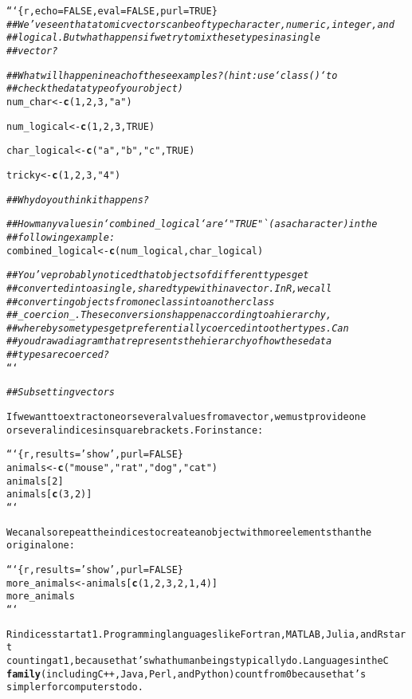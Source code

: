 \documentclass{article}\usepackage[]{graphicx}\usepackage[]{xcolor}
\makeatletter
\newcommand{\hlstr}[1]{\textcolor[rgb]{0.192,0.494,0.8}{#1}}%
\newcommand{\hlcom}[1]{\textcolor[rgb]{0.678,0.584,0.686}{\textit{#1}}}%
\newcommand{\hlkwd}[1]{\textcolor[rgb]{0.737,0.353,0.396}{\textbf{#1}}}%
\newenvironment{kframe}{%
 \def\at@end@of@kframe{}%
 \ifinner\ifhmode%
  \def\at@end@of@kframe{\end{minipage}}%
  \begin{minipage}{\columnwidth}%
 \fi\fi%
 \def\FrameCommand##1{\hskip\@totalleftmargin \hskip-\fboxsep
 \colorbox{shadecolor}{##1}\hskip-\fboxsep
     \hskip-\linewidth \hskip-\@totalleftmargin \hskip\columnwidth}%
 \MakeFramed {\advance\hsize-\width
   \@totalleftmargin\z@ \linewidth\hsize
   \@setminipage}}%
 {\par\unskip\endMakeFramed%
 \at@end@of@kframe}
\newenvironment{knitrout}{}{} %
\makeatother
\begin{document}
\begin{knitrout}
\begin{kframe}
\begin{alltt}
```\{r, echo = FALSE, eval = FALSE, purl = TRUE\}
\hlcom{## We’ve seen that atomic vectors can be of type character, numeric, integer, and}
\hlcom{## logical. But what happens if we try to mix these types in a single}
\hlcom{## vector?}

\hlcom{## What will happen in each of these examples? (hint: use `class()` to}
\hlcom{## check the data type of your object)}
num_char <- \hlkwd{c}(1, 2, 3, \hlstr{"a"})

num_logical <- \hlkwd{c}(1, 2, 3, TRUE)

char_logical <- \hlkwd{c}(\hlstr{"a"}, \hlstr{"b"}, \hlstr{"c"}, TRUE)

tricky <- \hlkwd{c}(1, 2, 3, \hlstr{"4"})

\hlcom{## Why do you think it happens?}


\hlcom{## How many values in `combined_logical` are `"TRUE"` (as a character) in the}
\hlcom{## following example:}
combined_logical <- \hlkwd{c}(num_logical, char_logical)

\hlcom{## You've probably noticed that objects of different types get}
\hlcom{## converted into a single, shared type within a vector. In R, we call}
\hlcom{## converting objects from one class into another class}
\hlcom{## _coercion_. These conversions happen according to a hierarchy,}
\hlcom{## whereby some types get preferentially coerced into other types. Can}
\hlcom{## you draw a diagram that represents the hierarchy of how these data}
\hlcom{## types are coerced?}
```

\hlcom{## Subsetting vectors}

If we want to extract one or several values from a vector, we must provide one
or several indices in square brackets. For instance:

```\{r, results = \hlstr{'show'}, purl = FALSE\}
animals <- \hlkwd{c}(\hlstr{"mouse"}, \hlstr{"rat"}, \hlstr{"dog"}, \hlstr{"cat"})
animals[2]
animals[\hlkwd{c}(3, 2)]
```

We can also repeat the indices to create an object with more elements than the
original one:

```\{r, results = \hlstr{'show'}, purl = FALSE\}
more_animals <- animals[\hlkwd{c}(1, 2, 3, 2, 1, 4)]
more_animals
```

R indices start at 1. Programming languages like Fortran, MATLAB, Julia, and R start
counting at 1, because that's what human beings typically do. Languages in the C
\hlkwd{family} (including C++, Java, Perl, and Python) count from 0 because that's
simpler for computers to do.


\end{alltt}
\end{kframe}
\end{knitrout}
\end{document}
